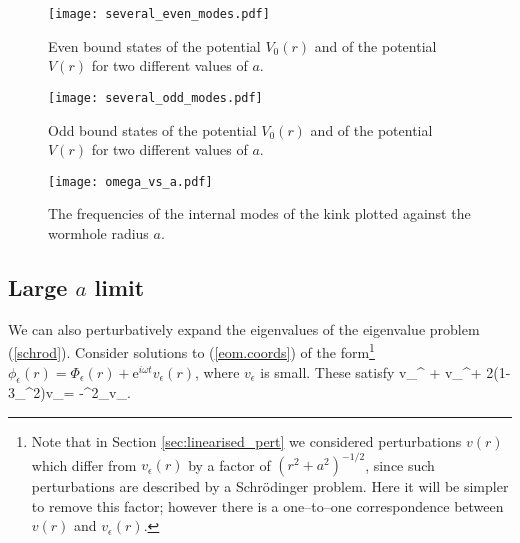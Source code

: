 

\begin{figure}
\texttt{[image: several\_even\_modes.pdf]}
\caption{\label{fig:even_states} Even bound states of the potential $V_0(r)$ and of the potential $V(r)$ for two different values of $a$.}
\end{figure}

\begin{figure}
\texttt{[image: several\_odd\_modes.pdf]}
\caption{\label{fig:odd_states} Odd bound states of the potential $V_0(r)$ and of the potential $V(r)$ for two different values of $a$.}
\end{figure}

\begin{figure}
\texttt{[image: omega\_vs\_a.pdf]}
\caption{\label{fig:omega_vs_a} The frequencies of the internal modes of the kink plotted against the wormhole radius $a$.}
\end{figure}

\subsection{Large $a$ limit}

We can also perturbatively expand the eigenvalues of the eigenvalue problem (\ref{schrod}). Consider solutions to (\ref{eom.coords}) of the form\footnote{Note that in Section \ref{sec:linearised_pert} we considered perturbations $v(r)$ which differ from $v_\epsilon(r)$ by a factor of $(r^2+a^2)^{-1/2}$, since such perturbations are described by a Schr\"odinger problem. Here it will be simpler to remove this factor; however there is a one--to--one correspondence between $v(r)$ and $v_\epsilon(r)$.} $\phi_\epsilon(r)=\Phi_\epsilon(r)+\mathrm{e}^{i\omega t}v_\epsilon(r)$, where $v_\epsilon$ is small.
These satisfy
\be
\label{eq:perturbed_large_a}
v_\epsilon^{\prime\prime} + v_\epsilon^\prime + 2(1-3\Phi_\epsilon^2)v_\epsilon = -\omega^2_\epsilon v_\epsilon.
\ee

